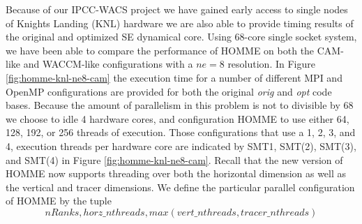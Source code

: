 Because of our IPCC-WACS project we have gained early access to single nodes of Knights Landing (KNL) hardware we are also able to provide timing results of the original and optimized SE dynamical core.  Using 68-core single socket system, we have been able to compare the performance of HOMME on both the CAM-like and WACCM-like configurations with a $ne=8$ resolution.  In Figure \ref{fig:homme-knl-ne8-cam} the execution time for a number of different MPI and OpenMP configurations are provided for both the original {\em orig} and {\em opt} code bases.  Because the amount of parallelism in this problem is not to divisible by 68 we choose to idle 4 hardware cores, and configuration HOMME to use either 64, 128, 192, or 256 threads of execution.  Those configurations that use a 1, 2, 3, and 4, execution threads per hardware core are indicated by SMT{1}, SMT(2), SMT(3), and SMT(4) in Figure \ref{fig:homme-knl-ne8-cam}.  Recall that the new version of HOMME  now supports threading over both the horizontal dimension as well as the vertical and tracer dimensions.  We define the particular parallel configuration of HOMME by the tuple 
$$
nRanks,  horz\_nthreads, max(vert\_nthreads,tracer\_nthreads)
$$
